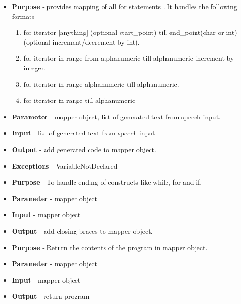 \documentclass[12pt]{article}
\newcounter{subsubsubsection}[subsubsection]
\begin{document}
\begin{itemize}
    \setlength{\itemsep}{1pt}
    \item \textbf{Purpose} - provides mapping of all for statements . It handles the following  formats - 	
    \begin{enumerate}
        \item for iterator [anything] (optional start\_point) till end\_point(char or int) (optional increment/decrement by int).
        \item for iterator in range from alphanumeric till alphanumeric increment by integer.
        \item for iterator in range alphanumeric till alphanumeric.
        \item for iterator in range till alphanumeric.
    \end{enumerate}
    \item \textbf{Parameter} - mapper object, list of generated text from speech input.
    \item \textbf{Input} - list of generated text from speech input.
    \item \textbf{Output} - add generated code to mapper object.
    \item \textbf{Exceptions} - VariableNotDeclared
\end{itemize}

\begin{itemize}
    \setlength{\itemsep}{1pt}
    \item \textbf{Purpose} -  To handle ending of constructs like while, for and if.
    \item \textbf{Parameter} - mapper object
    \item \textbf{Input} - mapper object
    \item \textbf{Output} - add closing braces to mapper object.
\end{itemize}

\begin{itemize}
    \setlength{\itemsep}{1pt}
    \item \textbf{Purpose} - Return the contents of the program in mapper object.
    \item \textbf{Parameter} - mapper object
    \item \textbf{Input} - mapper object
    \item \textbf{Output} - return program
\end{itemize}
\end{document}
